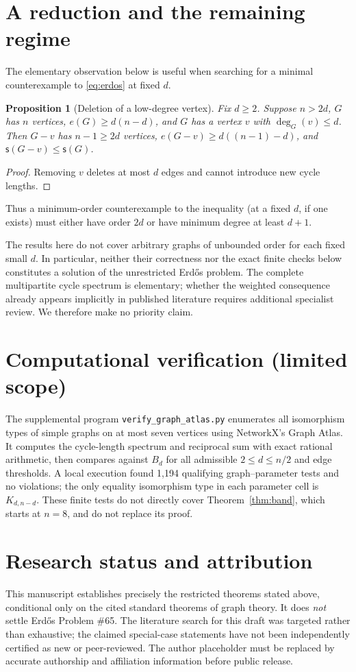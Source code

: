 \documentclass[11pt,letterpaper]{article}
\newtheorem{proposition}[theorem]{Proposition}
\newcommand{\hc}{\mathsf{s}}
\newcommand{\edges}{e}
\begin{document}
\section{A reduction and the remaining regime}
The elementary observation below is useful when searching
for a minimal counterexample to \eqref{eq:erdos} at fixed $d$.
\begin{proposition}[Deletion of a low-degree vertex]\label{prop:del}
Fix $d\ge2$.  Suppose $n>2d$, $G$ has $n$ vertices,
$\edges(G)\ge d(n-d)$, and $G$ has a vertex $v$ with
$\deg_G(v)\le d$.  Then $G-v$ has $n-1\ge2d$ vertices,
$\edges(G-v)\ge d((n-1)-d)$, and $\hc(G-v)\le\hc(G)$.
\end{proposition}
\begin{proof}
Removing $v$ deletes at most $d$ edges and cannot introduce
new cycle lengths.
\end{proof}
Thus a minimum-order counterexample to the inequality
(at a fixed $d$, if one exists) must either have order $2d$
or have minimum degree at least $d+1$.

The results here do not cover arbitrary graphs of unbounded order
for each fixed small $d$.  In particular, neither their correctness
nor the exact finite checks below constitutes a solution of the
unrestricted Erd\H{o}s problem.  The complete multipartite cycle
spectrum is elementary; whether the weighted consequence already
appears implicitly in published literature requires additional
specialist review.  We therefore make no priority claim.

\section*{Computational verification (limited scope)}
The supplemental program \texttt{verify\_graph\_atlas.py} enumerates
all isomorphism types of simple graphs on at most seven vertices
using NetworkX's Graph Atlas.  It computes the cycle-length spectrum
and reciprocal sum with exact rational arithmetic, then compares
against $B_d$ for all admissible $2\le d\le n/2$ and edge thresholds.
A local execution found 1,194 qualifying graph--parameter tests
and no violations; the only equality isomorphism type in each
parameter cell is $K_{d,n-d}$.  These finite tests do not directly
cover Theorem~\ref{thm:band}, which starts at $n=8$, and do not
replace its proof.

\section*{Research status and attribution}
This manuscript establishes precisely the restricted theorems
stated above, conditional only on the cited standard theorems
of graph theory.  It does \emph{not} settle Erd\H{o}s Problem \#65.
The literature search for this draft was targeted rather than
exhaustive; the claimed special-case statements have not been
independently certified as new or peer-reviewed.  The author
placeholder must be replaced by accurate authorship and affiliation
information before public release.
\end{document}
